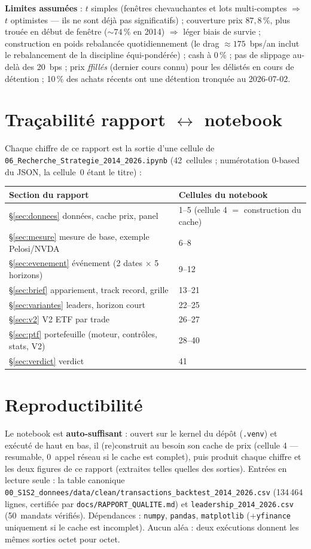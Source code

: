 \documentclass[11pt,a4paper]{article}
\newcommand{\code}[1]{\texttt{\small #1}}
\begin{document}
\textbf{Limites assumées} : $t$ simples (fenêtres chevauchantes et lots multi-comptes $\Rightarrow$ $t$
optimistes --- ils ne sont déjà pas significatifs) ; couverture prix $87{,}8\,\%$, plus trouée en début de
fenêtre ($\sim74\,\%$ en 2014) $\Rightarrow$ léger biais de survie ; construction en poids rebalancée
quotidiennement (le drag $\approx175$~bps/an inclut le rebalancement de la discipline équi-pondérée) ;
cash à 0\,\% ; pas de slippage au-delà des 20~bps ; prix \emph{ffillés} (dernier cours connu) pour les
délistés en cours de détention ; 10\,\% des achats récents ont une détention tronquée au 2026-07-02.

\appendix
\section{Traçabilité rapport $\leftrightarrow$ notebook}\label{app:trace}
Chaque chiffre de ce rapport est la sortie d'une cellule de
\code{06\_Recherche\_Strategie\_2014\_2026.ipynb} (42~cellules ; numérotation 0-based du JSON, la
cellule~0 étant le titre) :
\begin{center}\small
\begin{tabular}{ll}
\toprule
Section du rapport & Cellules du notebook \\
\midrule
\S\ref{sec:donnees} données, cache prix, panel & 1--5 (cellule 4 $=$ construction du cache) \\
\S\ref{sec:mesure} mesure de base, exemple Pelosi/NVDA & 6--8 \\
\S\ref{sec:evenement} événement (2 dates $\times$ 5 horizons) & 9--12 \\
\S\ref{sec:brief} appariement, track record, grille & 13--21 \\
\S\ref{sec:variantes} leaders, horizon court & 22--25 \\
\S\ref{sec:v2} V2 ETF par trade & 26--27 \\
\S\ref{sec:ptf} portefeuille (moteur, contrôles, stats, V2) & 28--40 \\
\S\ref{sec:verdict} verdict & 41 \\
\bottomrule
\end{tabular}
\end{center}

\section{Reproductibilité}
Le notebook est \textbf{auto-suffisant} : ouvert sur le kernel du dépôt (\code{.venv}) et exécuté de haut
en bas, il (re)construit au besoin son cache de prix (cellule 4 --- resumable, $0$~appel réseau si le
cache est complet), puis produit chaque chiffre et les deux figures de ce rapport (extraites telles
quelles des sorties). Entrées en lecture seule : la table canonique
\code{00\_S1S2\_donnees/data/clean/transactions\_backtest\_2014\_2026.csv} (134\,464 lignes, certifiée par
\code{docs/RAPPORT\_QUALITE.md}) et \code{leadership\_2014\_2026.csv} (50~mandats vérifiés). Dépendances :
\code{numpy}, \code{pandas}, \code{matplotlib} (+\code{yfinance} uniquement si le cache est incomplet).
Aucun aléa : deux exécutions donnent les mêmes sorties octet pour octet.
\end{document}
